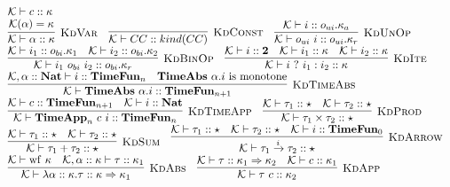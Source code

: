 \documentclass[fleqn]{article}
\begin{document}
\[
\begin{array}{l}
    \mathcal{K} \vdash c :: \kappa \\
    \infer[\textsc{KdVar}]{\mathcal{K} \vdash \alpha :: \kappa}{\mathcal{K}(\alpha)=\kappa} \hspace{1em}
    \infer[\textsc{KdConst}]{\mathcal{K} \vdash CC :: kind(CC)}{} \hspace{1em}
    \infer[\textsc{KdUnOp}]{\mathcal{K} \vdash o_{ui}~i :: o_{ui}.\kappa_r}{\mathcal{K} \vdash i :: o_{ui}.\kappa_a} \\
    \infer[\textsc{KdBinOp}]{\mathcal{K} \vdash i_1~o_{bi}~i_2 :: o_{bi}.\kappa_r}{\mathcal{K} \vdash i_1 :: o_{bi}.\kappa_1 & \mathcal{K} \vdash i_2 :: o_{bi}.\kappa_2} \hspace{1em}
    \infer[\textsc{KdIte}]{\mathcal{K} \vdash i~?~i_1 : i_2 :: \kappa}{\mathcal{K} \vdash i :: \mathbf{2} & \mathcal{K} \vdash i_1 :: \kappa & \mathcal{K} \vdash i_2 :: \kappa} \\
    \infer[\textsc{KdTimeAbs}]{\mathcal{K} \vdash \mathbf{TimeAbs}~\alpha. i :: \mathbf{TimeFun}_{n + 1}}{\mathcal{K},\alpha :: \mathbf{Nat} \vdash i :: \mathbf{TimeFun}_n & \mathbf{TimeAbs}~\alpha. i~\mathrm{is}~\mathrm{monotone}} \\
    \infer[\textsc{KdTimeApp}]{\mathcal{K} \vdash \mathbf{TimeApp}_n~c~i :: \mathbf{TimeFun}_n}{\mathcal{K} \vdash c :: \mathbf{TimeFun}_{n+1} & \mathcal{K} \vdash i :: \mathbf{Nat}} \hspace{1em}
    \infer[\textsc{KdProd}]{\mathcal{K} \vdash \tau_1 \times \tau_2 :: \star}{\mathcal{K} \vdash \tau_1 :: \star & \mathcal{K} \vdash \tau_2 :: \star} \\
    \infer[\textsc{KdSum}]{\mathcal{K} \vdash \tau_1 + \tau_2 :: \star}{\mathcal{K} \vdash \tau_1 :: \star & \mathcal{K} \vdash \tau_2 :: \star} \hspace{1em}
    \infer[\textsc{KdArrow}]{\mathcal{K} \vdash \tau_1 \xrightarrow{i} \tau_2 :: \star}{\mathcal{K} \vdash \tau_1 :: \star & \mathcal{K} \vdash \tau_2 :: \star & \mathcal{K} \vdash i :: \mathbf{TimeFun}_0} \\
    \infer[\textsc{KdAbs}]{\mathcal{K} \vdash \lambda \alpha :: \kappa. \tau :: \kappa \Rightarrow \kappa_1}{\mathcal{K} \vdash \mathrm{wf}~\kappa & \mathcal{K},\alpha :: \kappa \vdash \tau :: \kappa_1} \hspace{1em}
    \infer[\textsc{KdApp}]{\mathcal{K} \vdash \tau~c :: \kappa_2}{\mathcal{K} \vdash \tau :: \kappa_1 \Rightarrow \kappa_2 & \mathcal{K} \vdash c :: \kappa_1} \\

\end{array}\]
\end{document}
